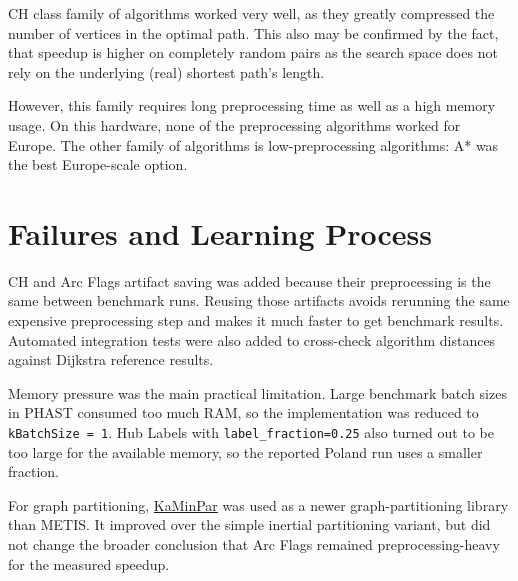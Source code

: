 \documentclass[11pt,a4paper]{article}
\begin{document}
CH class family of algorithms worked very well, as they greatly compressed the number of vertices
in the optimal path.
This also may be confirmed by the fact, that speedup is higher on completely random pairs as the search space
does not rely on the underlying (real) shortest path's length.

However, this family requires long preprocessing time as well as a high memory usage.
On this hardware, none of the preprocessing algorithms worked for Europe.
The other family of algorithms is low-preprocessing algorithms: A* was the best
Europe-scale option.

\section{Failures and Learning Process}
\label{sec:failures}

CH and Arc Flags artifact saving was added because their preprocessing is the
same between benchmark runs.  Reusing those artifacts avoids rerunning the same
expensive preprocessing step and makes it much faster to get benchmark results.
Automated integration tests were also added to cross-check algorithm distances
against Dijkstra reference results.

Memory pressure was the main practical limitation.  Large benchmark batch sizes
in PHAST consumed too much RAM, so the implementation was reduced to
\texttt{kBatchSize = 1}.  Hub Labels with
\texttt{label\_fraction=0.25} also turned out to be too large for the available
memory, so the reported Poland run uses a smaller fraction.

For graph partitioning, \href{https://github.com/KaHIP/KaMinPar}{KaMinPar} was
used as a newer graph-partitioning library than METIS.  It improved over the
simple inertial partitioning variant, but did not change the broader conclusion
that Arc Flags remained preprocessing-heavy for the measured speedup.

\clearpage

\end{document}

